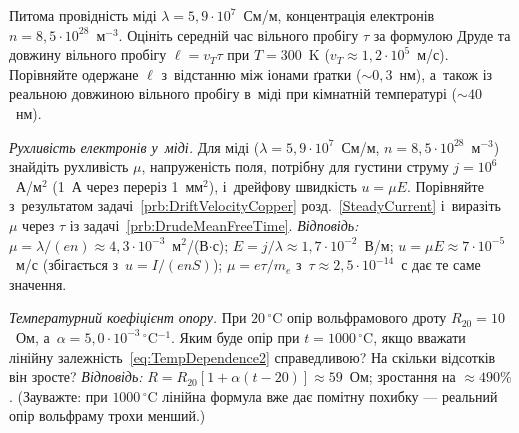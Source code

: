  {}
\begin{problem}\label{prb:DrudeMeanFreeTime}
	 Питома провідність міді
	$\lambda=5{,}9\cdot10^{7}$~См/м, концентрація електронів
	$n=8{,}5\cdot10^{28}$~м$^{-3}$. Оцініть середній час вільного пробігу $\tau$ за
	формулою Друде та  довжину вільного пробігу $\ell=v_T\tau$ при
	$T=300$~K ($v_T\approx1{,}2\cdot10^5$~м/с). Порівняйте одержане $\ell$ з~відстанню між
	іонами ґратки ($\sim0{,}3$~нм), а~також із реальною довжиною вільного пробігу в~міді
	при кімнатній температурі ($\sim40$~нм).
\end{problem}
\begin{problem}\label{prb:CopperMobility}
	\emph{Рухливість електронів у~міді.} Для міді ($\lambda=5{,}9\cdot10^{7}$~См/м,
	$n=8{,}5\cdot10^{28}$~м$^{-3}$) знайдіть рухливість $\mu$, напруженість поля, потрібну
	для густини струму $j=10^{6}$~А/м$^2$ (1~А через переріз 1~мм$^2$), і~дрейфову
	швидкість $u=\mu E$. Порівняйте з~результатом задачі~\ref{prb:DriftVelocityCopper}
	розд.~\ref{SteadyCurrent} і~виразіть $\mu$ через $\tau$ із
	задачі~\ref{prb:DrudeMeanFreeTime}. \emph{Відповідь:}
	$\mu=\lambda/(en)\approx4{,}3\cdot10^{-3}$~м$^2$/(В$\cdot$с);
	$E=j/\lambda\approx1{,}7\cdot10^{-2}$~В/м; $u=\mu E\approx7\cdot10^{-5}$~м/с
	(збігається з~$u=I/(enS)$); $\mu=e\tau/m_e$ з~$\tau\approx2{,}5\cdot10^{-14}$~с дає те
	саме значення.
\end{problem}
\begin{problem}\label{prb:TempCoefficient}
	\emph{Температурний коефіцієнт опору.} При $20\,^\circ$C опір вольфрамового дроту
	$R_{20}=10$~Ом, а~$\alpha=5{,}0\cdot10^{-3}\,{}^\circ$C$^{-1}$. Яким буде опір при
	$t=1000\,^\circ$C, якщо вважати лінійну залежність~\eqref{eq:TempDependence2}
	справедливою? На скільки відсотків він зросте? \emph{Відповідь:}
	$R=R_{20}[1+\alpha(t-20)]\approx59$~Ом; зростання на $\approx490\%$. (Зауважте: при
	$1000\,^\circ$C лінійна формула вже дає помітну похибку — реальний опір вольфраму
	трохи менший.)
\end{problem}

